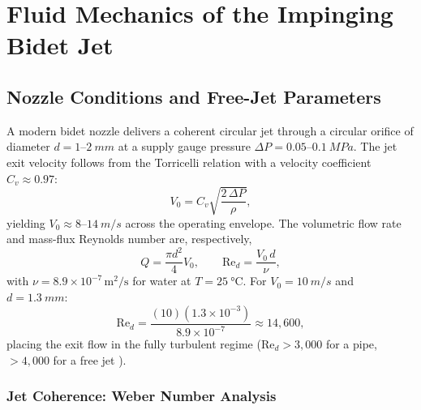 \documentclass[aps,prfluids,reprint,amsmath,amssymb,floatfix]{revtex4-2}
\newcommand{\Rey}{\mathrm{Re}}
\begin{document}
\section{Fluid Mechanics of the Impinging Bidet Jet}
\label{sec:fluid}

\subsection{Nozzle Conditions and Free-Jet Parameters}
\label{subsec:nozzle}

A modern bidet nozzle delivers a coherent circular jet through a circular
orifice of diameter $d = 1$--$\SI{2}{mm}$ at a supply gauge pressure
$\Delta P = 0.05$--$\SI{0.1}{MPa}$. The jet exit velocity follows from the
Torricelli relation with a velocity coefficient $C_v \approx 0.97$:
\begin{equation}
    V_0 = C_v \sqrt{\frac{2\,\Delta P}{\rho}},
    \label{eq:torricelli}
\end{equation}
yielding $V_0 \approx 8$--$\SI{14}{m/s}$ across the operating envelope.
The volumetric flow rate and mass-flux Reynolds number are, respectively,
\begin{equation}
    Q = \frac{\pi d^2}{4} V_0, \qquad
    \Rey_d = \frac{V_0\,d}{\nu},
    \label{eq:reynolds}
\end{equation}
with $\nu = 8.9 \times 10^{-7}\,\mathrm{m^2/s}$ for water at
$T = \SI{25}{\celsius}$. For $V_0 = \SI{10}{m/s}$ and $d = \SI{1.3}{mm}$:
\begin{equation}
    \Rey_d = \frac{(10)(1.3 \times 10^{-3})}{8.9 \times 10^{-7}}
    \approx 14{,}600,
\end{equation}
placing the exit flow in the fully turbulent regime ($\Rey_d > 3{,}000$
for a pipe, $>4{,}000$ for a free jet \citep{ZuckermanLior2006}).

\subsubsection{Jet Coherence: Weber Number Analysis}
\end{document}
